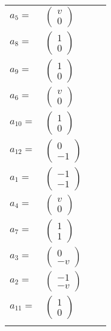\documentclass[1p]{elsarticle_modified}
\theoremstyle{definition}
\begin{document}
\begin{tabular}{m{7pt} m{180pt} m{7pt} m{180pt} }
\flushright $a_{5}=$&$\begin{pmatrix}v\\0\end{pmatrix}$ \\
\flushright $a_{8}=$&$\begin{pmatrix}1\\0\end{pmatrix}$ \\
\flushright $a_{9}=$&$\begin{pmatrix}1\\0\end{pmatrix}$ \\
\flushright $a_{6}=$&$\begin{pmatrix}v\\0\end{pmatrix}$ \\
\flushright $a_{10}=$&$\begin{pmatrix}1\\0\end{pmatrix}$ \\
\flushright $a_{12}=$&$\begin{pmatrix}0\\-1\end{pmatrix}$ \\
\flushright $a_{1}=$&$\begin{pmatrix}-1\\-1\end{pmatrix}$ \\
\flushright $a_{4}=$&$\begin{pmatrix}v\\0\end{pmatrix}$ \\
\flushright $a_{7}=$&$\begin{pmatrix}1\\1\end{pmatrix}$ \\
\flushright $a_{3}=$&$\begin{pmatrix}0\\- v\end{pmatrix}$ \\
\flushright $a_{2}=$&$\begin{pmatrix}-1\\- v\end{pmatrix}$ \\
\flushright $a_{11}=$&$\begin{pmatrix}1\\0\end{pmatrix}$\\&\end{tabular}
\end{document}
